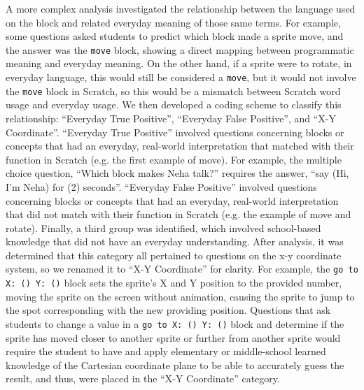 \documentclass[sigconf,manuscript,review,anonymous]{acmart} %
\begin{document}
A more complex analysis investigated the relationship between the language used on the block and related everyday meaning of those same terms. For example, some questions asked students to predict which block made a sprite move, and the answer was the \texttt{move} block, showing a direct mapping between programmatic meaning and everyday meaning. On the other hand, if a sprite were to rotate, in everyday language, this would still be considered a \texttt{move}, but it would not involve the \texttt{move} block in Scratch, so this would be a mismatch between Scratch word usage and everyday usage. We then developed a coding scheme to classify this relationship: ``Everyday True Positive'', ``Everyday False Positive'', and ``X-Y Coordinate''. ``Everyday True Positive'' involved questions concerning blocks or concepts that had an everyday, real-world interpretation that matched with their function in Scratch (e.g. the first example of move). For example, the multiple choice question, ``Which block makes Neha talk?'' requires the answer, ``say (Hi, I'm Neha) for (2) seconds''.  ``Everyday False Positive'' involved questions concerning blocks or concepts that had an everyday, real-world interpretation that did not match with their function in Scratch (e.g. the example of move and rotate). Finally, a third group was identified, which involved school-based knowledge that did not have an everyday understanding. After analysis, it was determined that this category all pertained to questions on the x-y coordinate system, so we renamed it to ``X-Y Coordinate'' for clarity. For example, the \texttt{go to X: () Y: ()} block sets the sprite's X and Y position to the provided number, moving the sprite on the screen without animation, causing the sprite to jump to the spot corresponding with the new providing position. Questions that ask students to change a value in a \texttt{go to X: () Y: ()} block and determine if the sprite has moved closer to another sprite or further from another sprite would require the student to have and apply elementary or middle-school learned knowledge of the Cartesian coordinate plane to be able to accurately guess the result, and thus, were placed in the ``X-Y Coordinate'' category. 

\end{document}
